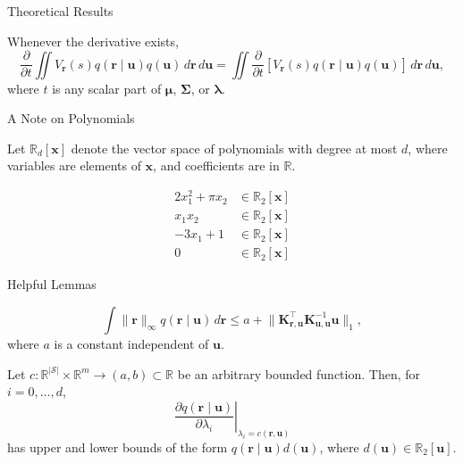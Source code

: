 \documentclass{beamer}
\newcommand{\Kuu}{\mathbf{K}_{\mathbf{u},\mathbf{u}}}
\newcommand{\Kru}{\mathbf{K}_{\mathbf{r},\mathbf{u}}}
\newcommand{\dt}{\frac{\partial}{\partial t}}
\newcommand{\dx}{\,d\mathbf{r}\,d\mathbf{u}}
\begin{document}
\begin{frame}{Theoretical Results}
  \begin{theorem} \label{thm:main}
    Whenever the derivative exists,
    \[
      \dt\iint
      V_{\mathbf{r}}(s)q(\mathbf{r} \mid \mathbf{u})q(\mathbf{u})\dx
      = \iint
      \dt[V_{\mathbf{r}}(s)q(\mathbf{r} \mid \mathbf{u})q(\mathbf{u})]\dx,
    \]
    where $t$ is any scalar part of $\bm\mu$, $\bm\Sigma$, or $\bm\lambda$.
  \end{theorem}
\end{frame}

\begin{frame}{A Note on Polynomials}
  \begin{definition}
    Let $\mathbb{R}_d[\mathbf{x}]$ denote the vector space of polynomials with
    degree at most $d$, where variables are elements of $\mathbf{x}$, and
    coefficients are in $\mathbb{R}$.
  \end{definition}
  \begin{example}
    \begin{align*}
      2x_1^2 + \pi x_2 &\in \mathbb{R}_2[\mathbf{x}] \\
      x_1x_2 &\in \mathbb{R}_2[\mathbf{x}] \\
      -3x_1 + 1 &\in \mathbb{R}_2[\mathbf{x}] \\
      0 &\in \mathbb{R}_2[\mathbf{x}]
    \end{align*}
  \end{example}
\end{frame}

\begin{frame}{Helpful Lemmas}
  \begin{lemma}
    \[
      \int \lVert \mathbf{r} \rVert_\infty q(\mathbf{r} \mid
      \mathbf{u})\,d\mathbf{r} \le a + \lVert \Kru^\intercal \Kuu^{-1}
      \mathbf{u} \rVert_1,
    \]
    where $a$ is a constant independent of $\mathbf{u}$.
  \end{lemma}
  \begin{lemma}
    Let $c : \mathbb{R}^{|\mathcal{S}|} \times \mathbb{R}^m \to (a, b) \subset
    \mathbb{R}$ be an arbitrary bounded function. Then, for $i = 0,
    \dots, d$,
    \[
      \left. \frac{\partial q(\mathbf{r} \mid \mathbf{u})}{\partial \lambda_i}
      \right|_{\lambda_i = c(\mathbf{r}, \mathbf{u})}
    \]
    has upper and lower bounds of the form $q(\mathbf{r} \mid
    \mathbf{u})d(\mathbf{u})$, where $d(\mathbf{u}) \in
    \mathbb{R}_2[\mathbf{u}]$.
  \end{lemma}
\end{frame}
\end{document}
